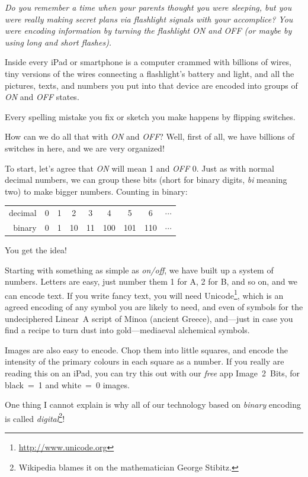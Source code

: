 \documentclass[12pt]{amsbook}
\begin{document}
{\textit{
Do you remember a time when your parents thought you were sleeping, but you were really making secret plans via flashlight signals with your accomplice?
You were encoding information by turning the flashlight \emph{ON} and \emph{OFF} (or maybe by using long and short flashes).}
\bigskip

Inside every iPad or smartphone is a computer crammed with billions of wires, tiny versions of the wires connecting a flashlight's battery and light, and all the pictures, texts, and numbers you put into that device are encoded into groups of \emph{ON} and \emph{OFF} states.

Every spelling mistake you fix or sketch you make happens by flipping switches.

How can we do all that with \emph{ON} and \emph{OFF}?  Well, first of all, we have billions of switches in here, and we are very organized!

To start, let's agree that \emph{ON} will mean 1 and \emph{OFF} 0.  
Just as with normal decimal numbers, we can group these bits (short for binary digits, \emph{bi} meaning two) to make bigger numbers.
Counting in binary:
\begin{center}
\begin{tabular}{rcccccccc}
decimal & 0 & 1 & 2 & 3 & 4 & 5 & 6 & $\cdots$\\
binary & 0 & 1 & 10 & 11 & 100 & 101 & 110 & $\cdots$\\
\end{tabular}
\end{center}
You get the idea!

Starting with something as simple as \emph{on/off},
we have built up a system of numbers.
Letters are easy, just number them 1 for A, 2 for B, 
and so on, and we can encode text.
If you write fancy text,
you will need Unicode\footnote{\url{http://www.unicode.org}},
which is an agreed encoding of any symbol you are likely to need,
and even of symbols for the undeciphered Linear~A script of Minoa (ancient Greece),
and---just in case you find a recipe to turn dust into gold---mediaeval alchemical symbols.

Images are also easy to encode. 
Chop them into little squares, and encode the intensity of the primary colours in each square as a number.
If you really are reading this on an iPad,
you can try this out with our \emph{free} app Image~2~Bits,
 for black~=~1 and white~=~0 images.

One thing I cannot explain is why all of our technology based on \emph{binary} encoding is called \emph{digital}\footnote{Wikipedia blames it on 
the mathematician George Stibitz.}!

}
\end{document}
